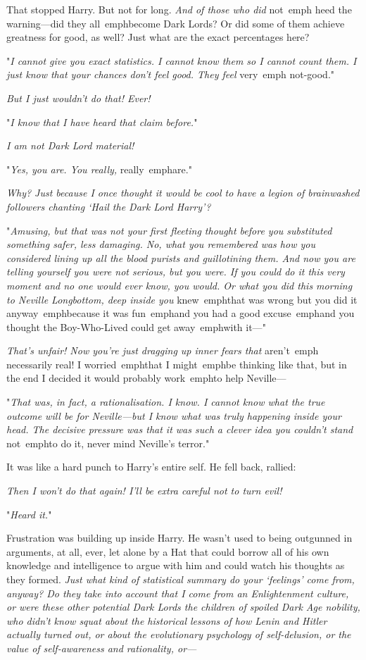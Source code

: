 That stopped Harry. But not for long. \emph{And of those who did} not\ emph{
heed the warning---did they} all\ emph{become Dark Lords? Or did some of them 
achieve greatness for good, as well? Just what are the exact percentages here?}

"\emph{I cannot give you exact statistics. I cannot know them so I cannot count 
them. I just know that your chances don't feel good. They feel} very\ emph{
not-good.}"

\emph{But I just wouldn't do that! Ever!}

"\emph{I know that I have heard that claim before.}"

\emph{I am not Dark Lord material!}

"\emph{Yes, you are. You really,} really\ emph{are.}"

\emph{Why? Just because I once thought it would be cool to have a legion of 
brainwashed followers chanting `Hail the Dark Lord Harry'?}

"\emph{Amusing, but that was not your first fleeting thought before you 
substituted something safer, less damaging. No, what you remembered was how you 
considered lining up all the blood purists and guillotining them. And now you 
are telling yourself you were not serious, but you were. If you could do it 
this very moment and no one would ever know, you would. Or what you did this 
morning to Neville Longbottom, deep inside you} knew\ emph{that was wrong but 
you did it} anyway\ emph{because it was} fun\ emph{and you had a} good 
excuse\ emph{and you thought the Boy-Who-Lived could} get away\ emph{with 
it---}"

\emph{That's unfair! Now you're just dragging up inner fears that} aren't\ emph{
necessarily real! I} worried\ emph{that I} might\ emph{be thinking like that, 
but in the end I decided it would probably} work\ emph{to help Neville---}

"\emph{That was, in fact, a rationalisation. I know. I cannot know what the 
true outcome will be for Neville---but I know what was truly happening inside 
your head. The decisive pressure was that it was such a clever idea you 
couldn't stand} not\ emph{to do it, never mind Neville's terror.}"

It was like a hard punch to Harry's entire self. He fell back, rallied:

\emph{Then I won't do that again! I'll be extra careful not to turn evil!}

"\emph{Heard it.}"

Frustration was building up inside Harry. He wasn't used to being outgunned in 
arguments, at all, ever, let alone by a Hat that could borrow all of his own 
knowledge and intelligence to argue with him and could watch his thoughts as 
they formed. \emph{Just what kind of statistical summary do your `feelings' 
come from, anyway? Do they take into account that I come from an Enlightenment 
culture, or were these other potential Dark Lords the children of spoiled Dark 
Age nobility, who didn't know squat about the historical lessons of how Lenin 
and Hitler actually turned out, or about the evolutionary psychology of 
self-delusion, or the value of self-awareness and rationality, or---}

